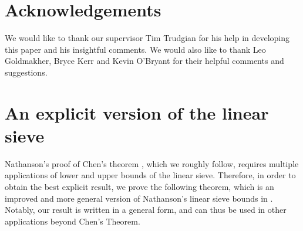 \documentclass[12pt]{amsart}
\begin{document}
\section*{Acknowledgements}
We would like to thank our supervisor Tim Trudgian for his help in developing this paper and his insightful comments. We would also like to thank Leo Goldmakher, Bryce Kerr and Kevin O’Bryant for their helpful comments and suggestions.

\section{An explicit version of the linear sieve}\label{sievesect}
\label{section:LS} 
Nathanson's proof of Chen's theorem \cite[\S 10]{Nathanson}, which we roughly follow, requires multiple applications of lower and upper bounds of the linear sieve. Therefore, in order to obtain the best explicit result, we prove the following theorem, which is an improved and more general version of Nathanson's linear sieve bounds in \cite[Theorem 9.7]{Nathanson}. Notably, our result is written in a general form, and can thus be used in other applications beyond Chen's Theorem.
\end{document}
